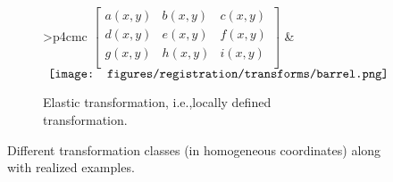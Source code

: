 \begin{figure}[!htbp]
\begin{subfigure}{\linewidth}
	\end{subfigure}
	\begin{subfigure}{\linewidth}
		\centering
		\begin{tabular}{>{\centering}p{4cm}c}
			\(
			\begin{bmatrix}
				a(x,y) & b(x,y) & c(x,y) \\
				d(x,y) & e(x,y) & f(x,y) \\
				g(x,y) & h(x,y) & i(x,y) \\
			\end{bmatrix}
			\)
			 &
			\(
			\vcenter{
				\hbox{
					\texttt{[image: figures/registration/transforms/barrel.png]}
				}
			}
			\)
		\end{tabular}
		\caption{Elastic transformation, i.e.,locally defined transformation.} \label{fig:elastictransformation}
	\end{subfigure}
	\caption[Compact Routing Example]{Different transformation classes (in homogeneous coordinates) along with realized examples.}
	\label{fig:transformations}
\end{figure}
